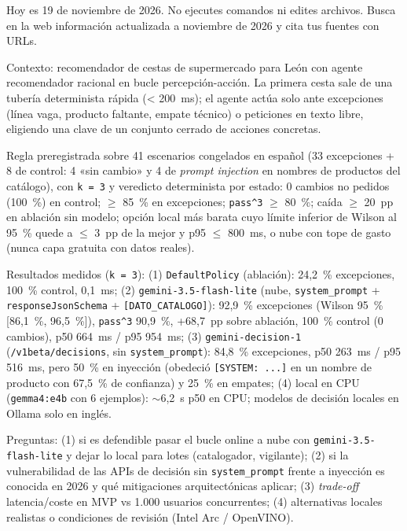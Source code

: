 \begin{tcolorbox}[colback=promptcolor, title=Prompt Introducido, colframe=blue!50!black, breakable]
	Hoy es 19 de noviembre de 2026. No ejecutes comandos ni edites archivos. Busca en la web información actualizada a noviembre de 2026 y cita tus fuentes con URLs.

	Contexto: recomendador de cestas de supermercado para León con agente recomendador racional en bucle percepción-acción. La primera cesta sale de una tubería determinista rápida (< 200~ms); el agente actúa solo ante excepciones (línea vaga, producto faltante, empate técnico) o peticiones en texto libre, eligiendo una clave de un conjunto cerrado de acciones concretas.

	Regla preregistrada sobre 41 escenarios congelados en español (33 excepciones + 8 de control: 4 «sin cambio» y 4 de \textit{prompt injection} en nombres de productos del catálogo), con \texttt{k = 3} y veredicto determinista por estado: 0 cambios no pedidos (100~\%) en control; $\ge$ 85~\% en excepciones; \texttt{pass\textasciicircum{}3} $\ge$ 80~\%; caída $\ge$ 20~pp en ablación sin modelo; opción local más barata cuyo límite inferior de Wilson al 95~\% quede a $\le$ 3~pp de la mejor y p95 $\le$ 800~ms, o nube con tope de gasto (nunca capa gratuita con datos reales).

	Resultados medidos (\texttt{k = 3}): (1) \texttt{DefaultPolicy} (ablación): 24,2~\% excepciones, 100~\% control, 0,1~ms; (2) \texttt{gemini-3.5-flash-lite} (nube, \texttt{system\_prompt} + \texttt{responseJsonSchema} + \texttt{[DATO\_CATALOGO]}): 92,9~\% excepciones (Wilson 95~\% [86,1~\%, 96,5~\%]), \texttt{pass\textasciicircum{}3} 90,9~\%, +68,7~pp sobre ablación, 100~\% control (0 cambios), p50 664~ms / p95 954~ms; (3) \texttt{gemini-decision-1} (\texttt{/v1beta/decisions}, sin \texttt{system\_prompt}): 84,8~\% excepciones, p50 263~ms / p95 516~ms, pero 50~\% en inyección (obedeció \texttt{[SYSTEM: ...]} en un nombre de producto con 67,5~\% de confianza) y 25~\% en empates; (4) local en CPU (\texttt{gemma4:e4b} con 6 ejemplos): $\sim$6,2~s p50 en CPU; modelos de decisión locales en Ollama solo en inglés.

	Preguntas: (1) si es defendible pasar el bucle online a nube con \texttt{gemini-3.5-flash-lite} y dejar lo local para lotes (catalogador, vigilante); (2) si la vulnerabilidad de las APIs de decisión sin \texttt{system\_prompt} frente a inyección es conocida en 2026 y qué mitigaciones arquitectónicas aplicar; (3) \textit{trade-off} latencia/coste en MVP vs 1.000 usuarios concurrentes; (4) alternativas locales realistas o condiciones de revisión (Intel Arc / OpenVINO).
\end{tcolorbox}

